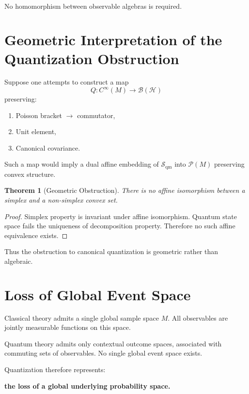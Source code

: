 \documentclass[11pt]{article}
\newtheorem{theorem}{Theorem}
\begin{document}
No homomorphism between observable algebras is required.

\section{Geometric Interpretation of the Quantization Obstruction}

Suppose one attempts to construct a map
\[
Q: C^\infty(M) \to \mathcal{B}(\mathcal{H})
\]
preserving:

\begin{enumerate}
\item Poisson bracket $\to$ commutator,
\item Unit element,
\item Canonical covariance.
\end{enumerate}

Such a map would imply a dual affine embedding
of $\mathcal{S}_{\mathrm{qm}}$ into $\mathcal{P}(M)$
preserving convex structure.

\begin{theorem}[Geometric Obstruction]
There is no affine isomorphism between a simplex
and a non-simplex convex set.
\end{theorem}

\begin{proof}
Simplex property is invariant under affine isomorphism.
Quantum state space fails the uniqueness of decomposition property.
Therefore no such affine equivalence exists.
\end{proof}

Thus the obstruction to canonical quantization
is geometric rather than algebraic.

\section{Loss of Global Event Space}

Classical theory admits a single global sample space $M$.
All observables are jointly measurable functions on this space.

Quantum theory admits only contextual outcome spaces,
associated with commuting sets of observables.
No single global event space exists.

Quantization therefore represents:

\begin{center}
\textbf{the loss of a global underlying probability space.}
\end{center}
\end{document}
